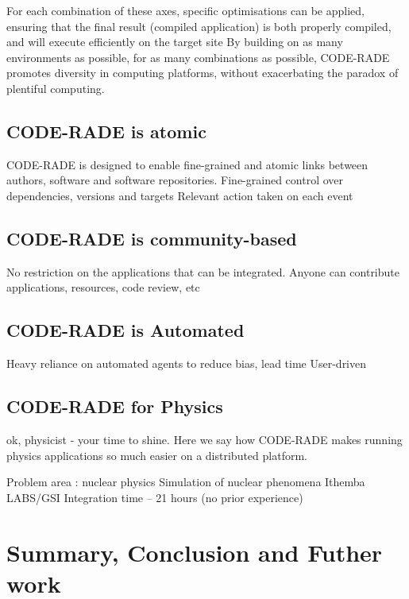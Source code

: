 \documentclass[a4paper]{jpconf}
\begin{document}
For each combination of these axes, specific optimisations can be applied, ensuring that the final result (compiled application) is both properly compiled, and will execute efficiently on the target site
By building on as many environments as possible, for as many combinations as possible, CODE-RADE promotes diversity in computing platforms, without exacerbating the paradox of plentiful computing.

\subsection{CODE-RADE is atomic}

CODE-RADE is designed to enable fine-grained and atomic links between authors, software and software repositories. 
Fine-grained control over dependencies, versions and targets
Relevant action taken on each event

\subsection{CODE-RADE is community-based}

No restriction on the applications that can be integrated.
Anyone can contribute applications, resources, code review, etc

\subsection{CODE-RADE is Automated}

Heavy reliance on automated agents to reduce bias, lead time
User-driven

	\subsection{CODE-RADE for Physics}

	ok, physicist - your time to shine. Here we say how CODE-RADE makes running physics applications so much easier on a distributed platform.

Problem area : nuclear physics
Simulation of nuclear phenomena
Ithemba LABS/GSI
Integration time – 21 hours (no prior experience)



	\section{Summary, Conclusion and Futher work}
\end{document}
